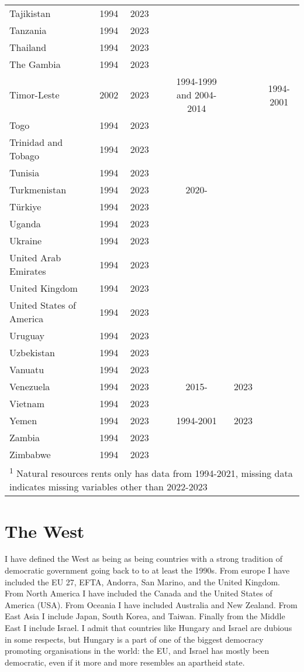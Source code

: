 {\begin{longtable}{lcccccc}
Tajikistan & 1994 & 2023 &  &  &  & \\
Tanzania & 1994 & 2023 &  &  &  & \\
Thailand & 1994 & 2023 &  &  &  & \\
The Gambia & 1994 & 2023 &  &  &  & \\
\addlinespace
Timor-Leste & 2002 & 2023 &  & 1994-1999 and 2004-2014 &  & 1994-2001\\
Togo & 1994 & 2023 &  &  &  & \\
Trinidad and Tobago & 1994 & 2023 &  &  &  & \\
Tunisia & 1994 & 2023 &  &  &  & \\
Turkmenistan & 1994 & 2023 &  & 2020- &  & \\
\addlinespace
Türkiye & 1994 & 2023 &  &  &  & \\
Uganda & 1994 & 2023 &  &  &  & \\
Ukraine & 1994 & 2023 &  &  &  & \\
United Arab Emirates & 1994 & 2023 &  &  &  & \\
United Kingdom & 1994 & 2023 &  &  &  & \\
\addlinespace
United States of America & 1994 & 2023 &  &  &  & \\
Uruguay & 1994 & 2023 &  &  &  & \\
Uzbekistan & 1994 & 2023 &  &  &  & \\
Vanuatu & 1994 & 2023 &  &  &  & \\
Venezuela & 1994 & 2023 &  & 2015- & 2023 & \\
\addlinespace
Vietnam & 1994 & 2023 &  &  &  & \\
Yemen & 1994 & 2023 &  & 1994-2001 & 2023 & \\
Zambia & 1994 & 2023 &  &  &  & \\
Zimbabwe & 1994 & 2023 &  &  &  & \\
\bottomrule
\multicolumn{7}{l}{\rule{0pt}{1em}\textsuperscript{1} Natural resources rents only has data from 1994-2021, missing data indicates missing variables other than 2022-2023}\\
\end{longtable}
}

\section{The West}
I have defined the West as being as being countries with a strong tradition of democratic government going back to to at least the 1990s. From europe I have included the EU 27, EFTA, Andorra, San Marino, and the United Kingdom. From North America I have included the Canada and the United States of America (USA). From Oceania I have included Australia and New Zealand. From East Asia I include Japan, South Korea, and Taiwan. Finally from the Middle East I include Israel. I admit that countries like Hungary and Israel are dubious in some respects, but Hungary is a part of one of the biggest democracy promoting organisations in the world: the EU, and Israel has mostly been democratic, even if it more and more resembles an apartheid state.

